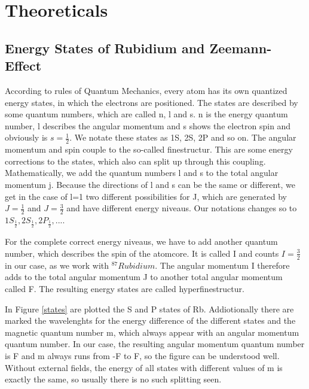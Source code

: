 \section{Theoreticals}
\subsection{Energy States of Rubidium and Zeemann-Effect}

According to rules of Quantum Mechanics, every atom has its own quantized energy states, in which the electrons are positioned. The states are described by some quantum numbers, which are called n, l and s. n is the energy quantum number, l describes the angular momentum and s shows the electron spin and obviously is $s=\frac{1}{2}$. We notate these states as 1S, 2S, 2P and so on.
The angular momentum and spin couple to the so-called finestructur. This are some energy corrections to the states, which also can split up through this coupling. Mathematically, we add the quantum numbers l and s to the total angular momentum j. Because the directions of l and s can be the same or different, we get in the case of l=1 two different possibilities for J, which are generated by $J=\frac{1}{2}$ and $J=\frac{3}{2}$ and have different energy niveaus. Our notations changes so to $1S_{\frac{1}{2}}, 2S_{\frac{1}{2}}, 2P_{\frac{1}{2}}, ...$.

For the complete correct energy niveaus, we have to add another quantum number, which describes the spin of the atomcore. It is called I and counts $I=\frac{3}{2}$ in our case, as we work with $^{87}Rubidium$. The angular momentum I therefore adds to the total angular momentum J to another total angular momentum called F. The resulting energy states are called hyperfinestructur.

In Figure \ref{states} are plotted the S and P states of Rb. Addiotionally there are marked the wavelenghts  for the energy difference of the different states and the magnetic quantum number m, which always appear with an angular momentum quantum number. In our case, the resulting angular momentum quantum number is F and m always runs from -F to F, so the figure can be understood well. Without external fields, the energy of all states with different values of m is exactly the same, so usually there is no such splitting seen.


